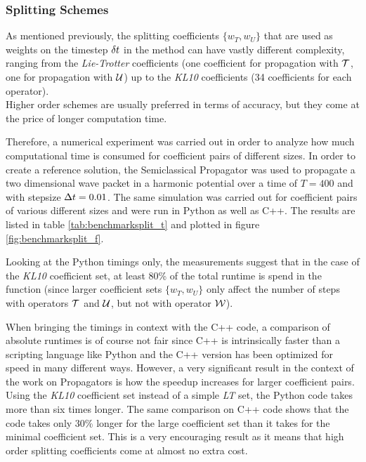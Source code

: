 \subsubsection{Splitting Schemes}
%
As mentioned previously, the splitting coefficients $\{ w_T, w_U \}$ that are used as weights on the timestep $\delta t$ in the  method can have vastly different complexity, ranging from the \emph{Lie-Trotter} coefficients (one coefficient for propagation with $\mathcal{T}$, one for propagation with $\mathcal{U}$) up to the \emph{KL10} coefficients (34 coefficients for each operator). \\
Higher order schemes are usually preferred in terms of accuracy, but they come at the price of longer computation time.
\par\medskip
%
Therefore, a numerical experiment was carried out in order to analyze how much computational time is consumed for coefficient pairs of different sizes.
In order to create a reference solution, the Semiclassical Propagator was used to propagate a two dimensional wave packet in a harmonic potential over a time of $T = 400$ and with stepsize $\Delta t = 0.01$.
The same simulation was carried out for coefficient pairs of various different sizes and were run in Python as well as C++.
The results are listed in table \ref{tab:benchmarksplit_t} and plotted in figure \ref{fig:benchmarksplit_f}.
\par\medskip
%
Looking at the Python timings only, the measurements suggest that in the case of the \emph{KL10} coefficient set, at least 80\% of the total runtime is spend in the  function (since larger coefficient sets $\{ w_T, w_U \}$ only affect the number of steps with operators $\mathcal{T}$ and $\mathcal{U}$, but not with operator $\mathcal{W}$).
\par\medskip
%
When bringing the timings in context with the C++ code, a comparison of absolute runtimes is of course not fair since C++ is intrinsically faster than a scripting language like Python and the C++ version has been optimized for speed in many different ways.
However, a very significant result in the context of the work on Propagators is how the speedup increases for larger coefficient pairs.
Using the \emph{KL10} coefficient set instead of a simple \emph{LT} set, the Python code takes more than six times longer.
The same comparison on C++ code shows that the code takes only 30\% longer for the large coefficient set than it takes for the minimal coefficient set.
This is a very encouraging result as it means that high order splitting coefficients come at almost no extra cost.
